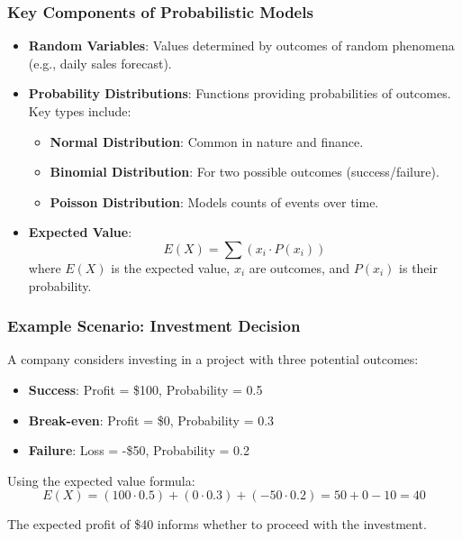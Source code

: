\documentclass[aspectratio=169]{beamer}
\begin{document}
\begin{frame}[fragile]
    \frametitle{Key Components of Probabilistic Models}
    \begin{itemize}
        \item \textbf{Random Variables}: Values determined by outcomes of random phenomena (e.g., daily sales forecast).
        
        \item \textbf{Probability Distributions}: Functions providing probabilities of outcomes. Key types include:
        \begin{itemize}
            \item \textbf{Normal Distribution}: Common in nature and finance.
            \item \textbf{Binomial Distribution}: For two possible outcomes (success/failure).
            \item \textbf{Poisson Distribution}: Models counts of events over time.
        \end{itemize}
        
        \item \textbf{Expected Value}: 
        \begin{equation}
            E(X) = \sum (x_i \cdot P(x_i))
        \end{equation}
        where \(E(X)\) is the expected value, \(x_i\) are outcomes, and \(P(x_i)\) is their probability.
    \end{itemize}
\end{frame}

\begin{frame}[fragile]
    \frametitle{Example Scenario: Investment Decision}
    A company considers investing in a project with three potential outcomes:
    \begin{itemize}
        \item \textbf{Success}: Profit = \$100, Probability = 0.5
        \item \textbf{Break-even}: Profit = \$0, Probability = 0.3
        \item \textbf{Failure}: Loss = -\$50, Probability = 0.2
    \end{itemize}
    
    Using the expected value formula:
    \begin{equation}
        E(X) = (100 \cdot 0.5) + (0 \cdot 0.3) + (-50 \cdot 0.2) = 50 + 0 - 10 = 40
    \end{equation}
    
    The expected profit of \$40 informs whether to proceed with the investment.
\end{frame}
\end{document}
